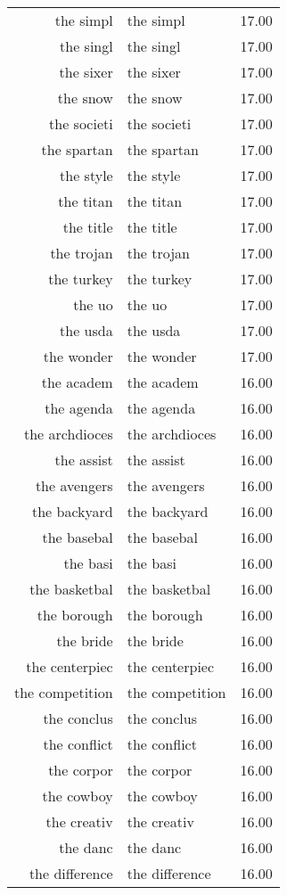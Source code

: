 \begin{table}[ht]
\begin{tabular}{rlr}
  the simpl & the simpl & 17.00 \\ 
  the singl & the singl & 17.00 \\ 
  the sixer & the sixer & 17.00 \\ 
  the snow & the snow & 17.00 \\ 
  the societi & the societi & 17.00 \\ 
  the spartan & the spartan & 17.00 \\ 
  the style & the style & 17.00 \\ 
  the titan & the titan & 17.00 \\ 
  the title & the title & 17.00 \\ 
  the trojan & the trojan & 17.00 \\ 
  the turkey & the turkey & 17.00 \\ 
  the uo & the uo & 17.00 \\ 
  the usda & the usda & 17.00 \\ 
  the wonder & the wonder & 17.00 \\ 
  the academ & the academ & 16.00 \\ 
  the agenda & the agenda & 16.00 \\ 
  the archdioces & the archdioces & 16.00 \\ 
  the assist & the assist & 16.00 \\ 
  the avengers & the avengers & 16.00 \\ 
  the backyard & the backyard & 16.00 \\ 
  the basebal & the basebal & 16.00 \\ 
  the basi & the basi & 16.00 \\ 
  the basketbal & the basketbal & 16.00 \\ 
  the borough & the borough & 16.00 \\ 
  the bride & the bride & 16.00 \\ 
  the centerpiec & the centerpiec & 16.00 \\ 
  the competition & the competition & 16.00 \\ 
  the conclus & the conclus & 16.00 \\ 
  the conflict & the conflict & 16.00 \\ 
  the corpor & the corpor & 16.00 \\ 
  the cowboy & the cowboy & 16.00 \\ 
  the creativ & the creativ & 16.00 \\ 
  the danc & the danc & 16.00 \\ 
  the difference & the difference & 16.00 \\ 

\end{tabular}
\end{table}
